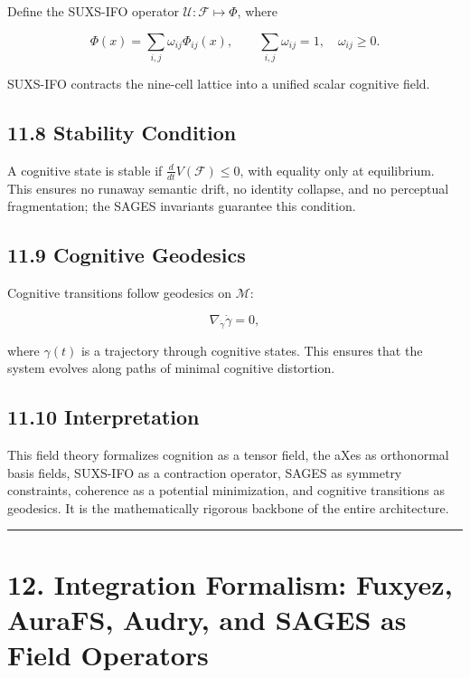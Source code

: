 Define the SUXS-IFO operator \(\mathcal{U} : \mathcal{F} \mapsto \Phi\), where

\[
\Phi(x) = \sum_{i,j} \omega_{ij} \Phi_{ij}(x), \qquad \sum_{i,j} \omega_{ij} = 1, \quad \omega_{ij} \ge 0.
\]

SUXS-IFO contracts the nine-cell lattice into a unified scalar cognitive field.

\subsection{11.8 Stability Condition}\label{stability-condition-11}

A cognitive state is stable if \(\frac{d}{dt} V(\mathcal{F}) \le 0\), with equality only at equilibrium. This ensures no runaway semantic drift, no identity collapse, and no perceptual fragmentation; the SAGES invariants guarantee this condition.

\subsection{11.9 Cognitive Geodesics}\label{cognitive-geodesics-11}

Cognitive transitions follow geodesics on \(\mathcal{M}\):

\[
\nabla_{\dot{\gamma}} \dot{\gamma} = 0,
\]

where \(\gamma(t)\) is a trajectory through cognitive states. This ensures that the system evolves along paths of minimal cognitive distortion.

\subsection{11.10 Interpretation}\label{interpretation-11}

This field theory formalizes cognition as a tensor field, the aXes as orthonormal basis fields, SUXS-IFO as a contraction operator, SAGES as symmetry constraints, coherence as a potential minimization, and cognitive transitions as geodesics. It is the mathematically rigorous backbone of the entire architecture.

\begin{center}\rule{0.5\linewidth}{0.5pt}\end{center}

\section{12. Integration Formalism: Fuxyez, AuraFS, Audry, and SAGES as Field Operators}\label{integration-formalism-fuxyez-aurafs-audry-and-sages-as-field-operators}

